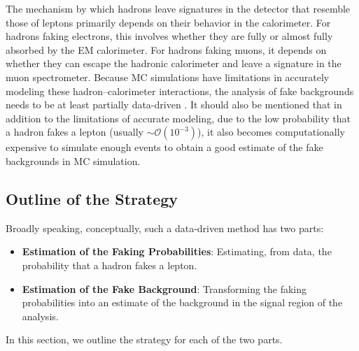 The mechanism by which hadrons leave signatures in the detector that resemble those of leptons primarily depends on their behavior in the calorimeter. For hadrons faking electrons, this involves whether they are fully or almost fully absorbed by the EM calorimeter. For hadrons faking muons, it depends on whether they can escape the hadronic calorimeter and leave a signature in the muon spectrometer. Because MC simulations have limitations in accurately modeling these hadron–calorimeter interactions, the analysis of fake backgrounds needs to be at least partially data-driven \cite{ATLAS:2022swp}. %
It should also be mentioned that in addition to the limitations of accurate modeling, due to the low probability that a hadron fakes a lepton (usually $\sim \mathcal{O}(10^{-3})$), it also becomes computationally expensive to simulate enough events to obtain a good estimate of the fake backgrounds in MC simulation. %
%
%
\subsection{Outline of the Strategy}
\label{sec:outline-of-strategy}
%
Broadly speaking, conceptually, such a data-driven method has two parts: 
\begin{itemize}
    \item \textbf{Estimation of the Faking Probabilities}: Estimating, from data, the probability that a hadron fakes a lepton. %
    \item \textbf{Estimation of the Fake Background}: Transforming the faking probabilities into an estimate of the background in the signal region of the analysis. %
\end{itemize}
In this section, we outline the strategy for each of the two parts. 
